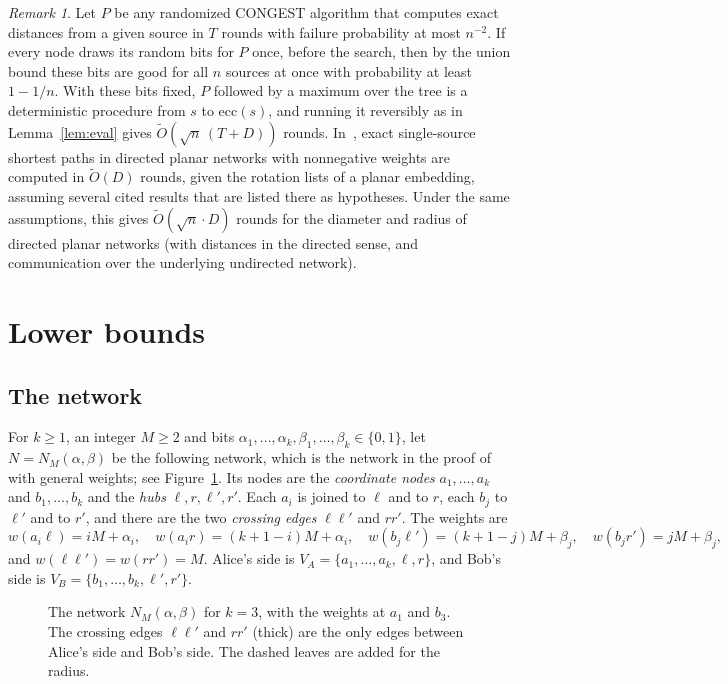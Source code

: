 \documentclass[11pt]{article}
\theoremstyle{definition}
\theoremstyle{remark}
\newtheorem{remark}[theorem]{Remark}
\newcommand{\ecc}{\mathrm{ecc}}
\newcommand{\Ot}{\tilde O}
\begin{document}
\begin{remark}\label{rem:directed}
Let $P$ be any randomized CONGEST algorithm that computes exact distances from a given source in $T$ rounds with failure probability at most $n^{-2}$. If every node draws its random bits for $P$ once, before the search, then by the union bound these bits are good for all $n$ sources at once with probability at least $1-1/n$. With these bits fixed, $P$ followed by a maximum over the tree is a deterministic procedure from $s$ to $\ecc(s)$, and running it reversibly as in Lemma~\ref{lem:eval} gives $\Ot(\sqrt n\,(T+D))$ rounds. In~\cite{Sen26}, exact single-source shortest paths in directed planar networks with nonnegative weights are computed in $\Ot(D)$ rounds, given the rotation lists of a planar embedding, assuming several cited results that are listed there as hypotheses. Under the same assumptions, this gives $\Ot(\sqrt n\cdot D)$ rounds for the diameter and radius of directed planar networks (with distances in the directed sense, and communication over the underlying undirected network).
\end{remark}

\section{Lower bounds}\label{sec:lower}

\subsection{The network}

For $k\ge 1$, an integer $M\ge 2$ and bits $\alpha_1,\dots,\alpha_k,\beta_1,\dots,\beta_k\in\{0,1\}$, let $N=N_M(\alpha,\beta)$ be the following network, which is the network in the proof of~\cite[Theorem~9]{ACK20} with general weights; see Figure~\ref{fig:network}. Its nodes are the \emph{coordinate nodes} $a_1,\dots,a_k$ and $b_1,\dots,b_k$ and the \emph{hubs} $\ell, r, \ell', r'$. Each $a_i$ is joined to $\ell$ and to $r$, each $b_j$ to $\ell'$ and to $r'$, and there are the two \emph{crossing edges} $\ell\ell'$ and $rr'$. The weights are
\[
w(a_i\ell)=iM+\alpha_i,\quad w(a_ir)=(k+1-i)M+\alpha_i,\quad w(b_j\ell')=(k+1-j)M+\beta_j,\quad w(b_jr')=jM+\beta_j,
\]
and $w(\ell\ell')=w(rr')=M$. Alice's side is $V_A=\{a_1,\dots,a_k,\ell,r\}$, and Bob's side is $V_B=\{b_1,\dots,b_k,\ell',r'\}$.

\begin{figure}[t]
\centering

\caption{The network $N_M(\alpha,\beta)$ for $k=3$, with the weights at $a_1$ and $b_3$. The crossing edges $\ell\ell'$ and $rr'$ (thick) are the only edges between Alice's side and Bob's side. The dashed leaves are added for the radius.}
\label{fig:network}
\end{figure}
\end{document}
